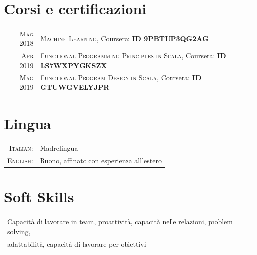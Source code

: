\documentclass[a4paper,10pt]{article}
\begin{document}

\section{Corsi e certificazioni}

\begin{tabular}{rl}
\textsc{Mag} 2018 & \textsc{Machine Learning},  Coursera: \textbf{ID 9PBTUP3QG2AG}\\
\textsc{Apr} 2019 & \textsc{Functional Programming Principles in Scala},  Coursera: \textbf{ID LS7WXPYGKSZX}\\
\textsc{Mag} 2019 & \textsc{Functional Program Design in Scala},  Coursera: \textbf{ID GTUWGVELYJPR}
\end{tabular}


\section{Lingua}

\begin{tabular}{rl}
\textsc{Italian:} & Madrelingua\\
\textsc{English:} & Buono, affinato con esperienza all'estero
\end{tabular}


\section{Soft Skills}

\begin{tabular}{lr}
Capacità di lavorare in team, proattività, capacità nelle relazioni, problem solving, \\
adattabilità, capacità di lavorare per obiettivi
\end{tabular}

\end{document}
